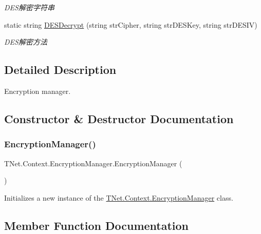 \begin{DoxyCompactItemize}
\begin{DoxyCompactList}\small\item\em D\+E\+S解密字符串 \end{DoxyCompactList}\item 
static string \mbox{\hyperlink{class_t_net_1_1_context_1_1_encryption_manager_ac260b059fc5348bf1d073dc1a58a2656}{D\+E\+S\+Decrypt}} (string str\+Cipher, string str\+D\+E\+S\+Key, string str\+D\+E\+S\+IV)
\begin{DoxyCompactList}\small\item\em D\+E\+S解密方法 \end{DoxyCompactList}\end{DoxyCompactItemize}


\subsection{Detailed Description}
Encryption manager. 



\subsection{Constructor \& Destructor Documentation}
\mbox{\label{class_t_net_1_1_context_1_1_encryption_manager_a5e2c6bddb36ca9a312b620cc71b3fc1d}} 
\subsubsection{\texorpdfstring{Encryption\+Manager()}{EncryptionManager()}}
{\footnotesize\ttfamily T\+Net.\+Context.\+Encryption\+Manager.\+Encryption\+Manager (\begin{DoxyParamCaption}{ }\end{DoxyParamCaption})}



Initializes a new instance of the \mbox{\hyperlink{class_t_net_1_1_context_1_1_encryption_manager}{T\+Net.\+Context.\+Encryption\+Manager}} class. 



\subsection{Member Function Documentation}
\mbox{\label{class_t_net_1_1_context_1_1_encryption_manager_a8f1224c4da5aca9cf7a84d7aaca378a1}} 

